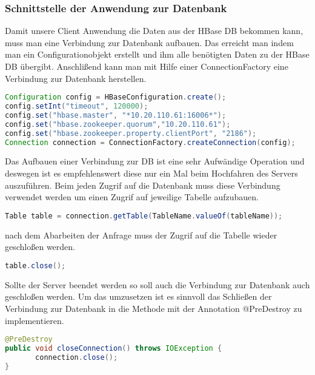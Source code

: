 \subsubsection{Schnittstelle der Anwendung zur Datenbank}

Damit unsere Client Anwendung die Daten aus der HBase DB bekommen kann, muss man eine Verbindung zur Datenbank aufbauen.
Das erreicht man indem man ein Configurationobjekt  erstellt und ihm alle benötigten Daten zu der HBase DB übergibt. Anschlißend kann man mit Hilfe einer ConnectionFactory eine Verbindung zur Datenbank herstellen.

\begin{lstlisting}[language=Java]
Configuration config = HBaseConfiguration.create();
config.setInt("timeout", 120000);
config.set("hbase.master", "*10.20.110.61:16006*");
config.set("hbase.zookeeper.quorum","10.20.110.61");
config.set("hbase.zookeeper.property.clientPort", "2186");
Connection connection = ConnectionFactory.createConnection(config);
\end{lstlisting}

Das Aufbauen einer Verbindung zur DB ist eine sehr Aufwändige Operation und deswegen ist es empfehlenswert diese nur ein Mal beim Hochfahren des Servers auszuführen.
Beim jeden Zugrif auf die Datenbank muss diese Verbindung verwendet werden um einen Zugrif auf jeweilige Tabelle aufzubauen.

\begin{lstlisting}[language=Java]
Table table = connection.getTable(TableName.valueOf(tableName));
\end{lstlisting}

nach dem Abarbeiten der Anfrage muss der Zugrif auf die Tabelle wieder geschloßen werden.
\begin{lstlisting}[language=Java]
table.close();
\end{lstlisting}

Sollte der Server beendet werden so soll auch die Verbindung zur Datenbank auch geschloßen werden.
Um das umzusetzen ist es sinnvoll das Schließen der Verbindung zur Datenbank in die Methode mit der Annotation     @PreDestroy zu implementieren.

\begin{lstlisting}[language=Java]
@PreDestroy
public void closeConnection() throws IOException {
       connection.close();
}
\end{lstlisting}

